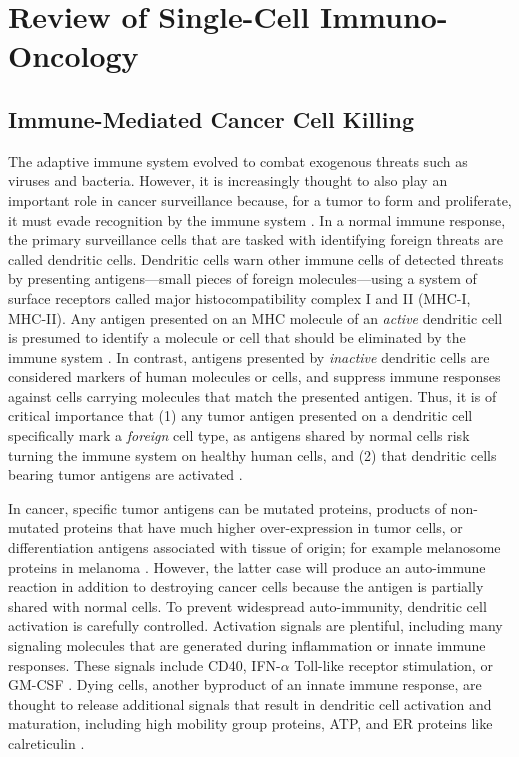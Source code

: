 
\chapter[Review of Single-Cell Immuno-Oncology][Review of Single-Cell Immuno-Oncology]{Review of Single-Cell Immuno-Oncology}


\section{Immune-Mediated Cancer Cell Killing}

The adaptive immune system evolved to combat exogenous threats such as viruses and bacteria. 
However, it is increasingly thought to also play an important role in cancer surveillance because, for a tumor to form and proliferate, it must evade recognition by the immune system \citep{Corthay2014}. 
In a normal immune response, the primary surveillance cells that are tasked with identifying foreign threats are called dendritic cells. 
Dendritic cells warn other immune cells of detected threats by presenting antigens---small pieces of foreign molecules---using a system of surface receptors called major histocompatibility complex I and II (MHC-I, MHC-II).
Any antigen presented on an MHC molecule of an \textit{active} dendritic cell is presumed to identify a molecule or cell that should be eliminated by the immune system \citep{Joffre2009}.
In contrast, antigens presented by \textit{inactive} dendritic cells are considered markers of human molecules or cells, and suppress immune responses against cells carrying molecules that match the presented antigen.  
Thus, it is of critical importance that (1) any tumor antigen presented on a dendritic cell specifically mark a \textit{foreign} cell type, as antigens shared by normal cells risk turning the immune system on healthy human cells, and (2) that dendritic cells bearing tumor antigens are activated \citep{Darrasse-Jeze2009,Steinman2000}.

In cancer, specific tumor antigens can be mutated proteins, products of non-mutated proteins that have much higher over-expression in tumor cells, or differentiation antigens associated with tissue of origin; for example melanosome proteins in melanoma \citep{Boon2006,Segal2008}.
However, the latter case will produce an auto-immune reaction in addition to destroying cancer cells because the antigen is partially shared with normal cells.
To prevent widespread auto-immunity, dendritic cell activation is carefully controlled.
Activation signals are plentiful, including many signaling molecules that are generated during inflammation or innate immune responses.
These signals include CD40, IFN-$\alpha$ Toll-like receptor stimulation, or GM-CSF \citep{Lippitz2013}. 
Dying cells, another byproduct of an innate immune response, are thought to release additional signals that result in dendritic cell activation and maturation, including high mobility group proteins, ATP, and ER proteins like calreticulin \citep{Zitvogel2009}.

